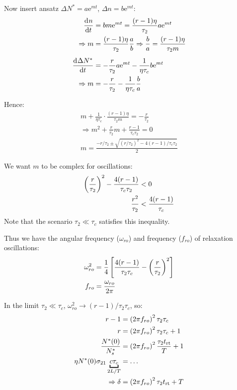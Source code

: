 \begin{parts}
	Now insert ansatz $\Delta N^* = a\mathrm{e}^{mt}$, $\Delta n = b\mathrm{e}^{mt}$:
	\begin{align*}
		\frac{\mathrm{d}^{}{n}}{\mathrm{d}{t}^{}} &= bm\mathrm{e}^{mt} = \frac{(r-1) \eta}{\tau_2} a\mathrm{e}^{mt} \\
		\Rightarrow m &= \frac{(r-1) \eta}{\tau_2} \frac{a}{b} \Rightarrow \frac{b}{a} = \frac{(r-1) \eta}{\tau_2 m} \\[.5em]
		\frac{\mathrm{d}^{}{\Delta N^*}}{\mathrm{d}{t}^{}} &= -\frac{r}{\tau_2} a\mathrm{e}^{mt} - \frac{1}{\eta \tau_c} b\mathrm{e}^{mt} \\
		\Rightarrow m &= -\frac{r}{\tau_2} - \frac{1}{\eta \tau_c} \frac{b}{a}
	\end{align*}
	
	Hence:
	\begin{gather*}
		m + \frac{1}{\eta \tau_c} \cdot \frac{(r-1) \eta}{\tau_2 m} = -\frac{r}{\tau_2} \\
		\Rightarrow m^2 + \frac{r}{\tau_2} m + \frac{r-1}{\tau_c \tau_2} = 0 \\
		m = \frac{-r/\tau_2 \pm \sqrt{(r/\tau_2)^2 - 4(r-1)/\tau_c \tau_2}}{2}
	\end{gather*}
	
	We want $m$ to be complex for oscillations:
	\begin{align*}
		\left(\frac{r}{\tau_2}\right)^2 - \frac{4(r-1)}{\tau_c \tau_2} &< 0 \\
		\frac{r^2}{\tau_2} &< \frac{4(r-1)}{\tau_c}
	\end{align*}
	Note that the scenario $\tau_2 \ll \tau_c$ satisfies this inequality.
	
	Thus we have the angular frequency ($\omega_{ro}$) and frequency ($f_{ro}$) of relaxation oscillations:
	\begin{align*}
		\omega_{ro}^2 &= \frac{1}{4} \left[\frac{4(r-1)}{\tau_2 \tau_c} - \left(\frac{r}{\tau_2}\right)^2\right] \\
		f_{ro} &= \frac{\omega_{ro}}{2\pi}
	\end{align*}
	
	In the limit $\tau_2 \ll \tau_c$, $\omega_{ro}^2 \rightarrow (r-1)/\tau_2 \tau_c$, so:
	\begin{align*}
		r-1 &= \rbracket{2\pi f_{ro}}^2 \tau_2 \tau_c \\
		r &= \rbracket{2\pi f_{ro}}^2 \tau_2 \tau_c + 1 \\
		\frac{N^*(0)}{N^*_s} &= \rbracket{2\pi f_{ro}}^2 \frac{\tau_2 t_\textnormal{rt}}{T} + 1 \\
		\eta N^*(0) \sigma_{21} \underbracket{c \tau_c}_{2L/T} &= \ldots \\
		\Rightarrow \delta &= \rbracket{2\pi f_{ro}}^2 \tau_2 t_\textnormal{rt} + T
	\end{align*}
	

\end{parts}

